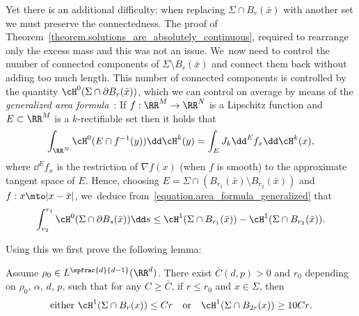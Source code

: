 Yet there is an additional difficulty: when replacing $\Sigma \cap B_r(\bar x)$ with
another set we must preserve the connectedness.
The proof of Theorem~\ref{theorem.solutions_are_absolutely_continuous}, required to rearrange only the excess mass
and this was not an issue. We~now need to control the number of connected components
of $\Sigma \setminus B_r(\bar x)$ and connect them back without adding
too much length.
This number of connected components is controlled by the
quantity \hbox{$\cH^0(\Sigma\cap\partial B_r(\bar x))$}, which we can control on average
by means of the \emph{generalized area formula}~\cite[Th.\,2.91]{ambrosio2000functions}: If $f:\RR^M \to \RR^N$ is a Lipschitz function and $E\subset \RR^M$ is a $k$-rectifiable set then it holds that
\begin{equation}
\label{equation.area_formula_generalized}
\int_{\RR^N} \cH^0(E \cap f^{-1}(y))\dd\cH^k(y)
=
\int_{E} J_k\dd^Ef_x \dd\cH^k(x),
\end{equation}
where $\dd^Ef_x$ is the restriction of $\nabla f(x)$ (when $f$ is smooth) to the approximate tangent space of $E$.
Hence, choosing $E = \Sigma \cap (B_{r_1}(\bar x) \setminus B_{r_2}(\bar x))$ and $f : x \mto |x - \bar x|$, we~deduce from~\eqref{equation.area_formula_generalized} that
\begin{equation}\label{equation.area_formula_generalized_inequality}
\int_{r_2}^{r_1} \cH^0(\Sigma \cap \partial B_s(\bar x))\dd s
\le
\cH^1(\Sigma \cap B_{r_1}(\bar x)) - \cH^1(\Sigma \cap B_{r_2}(\bar x)).
\end{equation}

Using this we first prove the following lemma:
\begin{lemma}\label{lemma.ahlfors}
Assume $\rho_0\in L^{\spfrac{d}{d-1}}(\RR^d)$.
There exist $\bar C(d,p)>0$ and $r_0$ depending on $\rho_0$, $\alpha$, $d$, $p$, such
that for any $C\ge \bar C$, if $r\le r_0$ and $x\in \Sigma$,
then
\[
\text{either $\cH^1(\Sigma\cap B_r(x))\le Cr$\quad or\quad $\cH^1(\Sigma\cap B_{2r}(x))\ge 10Cr$.}
\]

\end{lemma}

